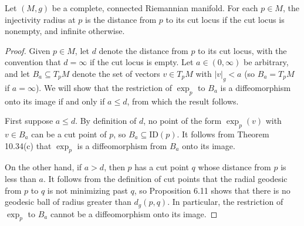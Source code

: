\begin{proposition}
\label{prop:injectivity-radius-cut-locus}
Let $(M,g)$ be a complete, connected Riemannian manifold. For each $p \in M$, the injectivity radius at $p$ is the distance from $p$ to its cut locus if the cut locus is nonempty, and infinite otherwise.

\begin{proof}
Given $p \in M$, let $d$ denote the distance from $p$ to its cut locus, with the convention that $d = \infty$ if the cut locus is empty. Let $a \in (0, \infty)$ be arbitrary, and let $B_a \subseteq T_pM$ denote the set of vectors $v \in T_pM$ with $|v|_g < a$ (so $B_a = T_pM$ if $a = \infty$). We will show that the restriction of $\exp_p$ to $B_a$ is a diffeomorphism onto its image if and only if $a \leq d$, from which the result follows.

First suppose $a \leq d$. By definition of $d$, no point of the form $\exp_p(v)$ with $v \in B_a$ can be a cut point of $p$, so $B_a \subseteq \text{ID}(p)$. It follows from Theorem 10.34(c) that $\exp_p$ is a diffeomorphism from $B_a$ onto its image.

On the other hand, if $a > d$, then $p$ has a cut point $q$ whose distance from $p$ is less than $a$. It follows from the definition of cut points that the radial geodesic from $p$ to $q$ is not minimizing past $q$, so Proposition 6.11 shows that there is no geodesic ball of radius greater than $d_g(p,q)$. In particular, the restriction of $\exp_p$ to $B_a$ cannot be a diffeomorphism onto its image.
\end{proof}
\end{proposition}

